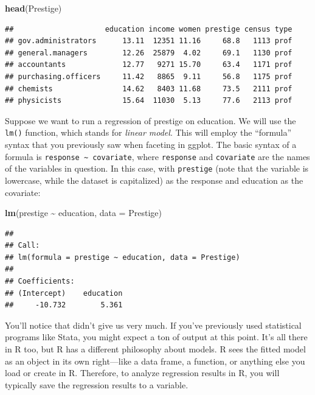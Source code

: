 \documentclass[
  12pt,
  oneside,openany]{book}
\newenvironment{Shaded}{\begin{snugshade}}{\end{snugshade}}
\newcommand{\DataTypeTok}[1]{\textcolor[rgb]{0.13,0.29,0.53}{#1}}
\newcommand{\KeywordTok}[1]{\textcolor[rgb]{0.13,0.29,0.53}{\textbf{#1}}}
\newcommand{\NormalTok}[1]{#1}
\newcommand{\OperatorTok}[1]{\textcolor[rgb]{0.81,0.36,0.00}{\textbf{#1}}}
\newcommand{\StringTok}[1]{\textcolor[rgb]{0.31,0.60,0.02}{#1}}
\begin{document}
\begin{Shaded}
\begin{Highlighting}[]
\KeywordTok{head}\NormalTok{(Prestige)}
\end{Highlighting}
\end{Shaded}

\begin{verbatim}
##                     education income women prestige census type
## gov.administrators      13.11  12351 11.16     68.8   1113 prof
## general.managers        12.26  25879  4.02     69.1   1130 prof
## accountants             12.77   9271 15.70     63.4   1171 prof
## purchasing.officers     11.42   8865  9.11     56.8   1175 prof
## chemists                14.62   8403 11.68     73.5   2111 prof
## physicists              15.64  11030  5.13     77.6   2113 prof
\end{verbatim}

Suppose we want to run a regression of prestige on education. We will use the \texttt{lm()} function, which stands for \emph{linear model}. This will employ the ``formula'' syntax that you previously saw when faceting in ggplot. The basic syntax of a formula is \texttt{response\ \textasciitilde{}\ covariate}, where \texttt{response} and \texttt{covariate} are the names of the variables in question. In this case, with \texttt{prestige} (note that the variable is lowercase, while the dataset is capitalized) as the response and education as the covariate:

\begin{Shaded}
\begin{Highlighting}[]
\KeywordTok{lm}\NormalTok{(prestige }\OperatorTok{\textasciitilde{}}\StringTok{ }\NormalTok{education, }\DataTypeTok{data =}\NormalTok{ Prestige)}
\end{Highlighting}
\end{Shaded}

\begin{verbatim}
## 
## Call:
## lm(formula = prestige ~ education, data = Prestige)
## 
## Coefficients:
## (Intercept)    education  
##     -10.732        5.361
\end{verbatim}

You'll notice that didn't give us very much. If you've previously used statistical programs like Stata, you might expect a ton of output at this point. It's all there in R too, but R has a different philosophy about models. R sees the fitted model as an object in its own right---like a data frame, a function, or anything else you load or create in R. Therefore, to analyze regression results in R, you will typically save the regression results to a variable.
\end{document}
